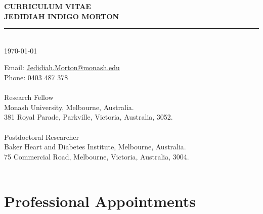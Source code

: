 \documentclass[11pt]{article}
\newcommand{\thedate}{\today}
\begin{document}
\begin{titlepage}
    \begin{center}
        \Huge
        \textbf{CURRICULUM VITAE \\
JEDIDIAH INDIGO MORTON}
\rule{16cm}{2mm} \\
\Large
\thedate \\
       \vfill
    \end{center}
        \Large

\noindent
Email: \color{blue}
 \href{mailto:Jedidiah.Morton@Monash.edu}{Jedidiah.Morton@monash.edu} \\
\color{black}
Phone: \color{blue} 0403 487 378 \\
\color{black}
 \\
Research Fellow \\
Monash University, Melbourne, Australia. \\
381 Royal Parade, Parkville, Victoria, Australia, 3052. \\
 \\
Postdoctoral Researcher \\
Baker Heart and Diabetes Institute, Melbourne, Australia. \\
75 Commercial Road, Melbourne, Victoria, Australia, 3004. \\
\\
\end{titlepage}

\tableofcontents


\color{white}
\cite{TanAJE2024,
DinaEJPC2024,
MortonVIH2024,
MehtaDRCP2024,
LivoriHLC2024,
FelekeDC2024,
ZiserBJCP2024,
ZiserJD2024,
AbebeNeur2024,
AbebeNeu2024,
DoodyAGG2024,
MacPE2024,
MortonDRCP2024,
TanCPT2024,
tanDRCP2024,
LivoriIJC2024,
LivoriEJPC2023,
MacCO2024,
FelekeDRCP2023,
LordPPT2023,
AbebeEHJ2023,
MortonPECA2023,
MortonAJKD2023,
DoodyAGG2023,
MacCirc2023,
DinaPE2023,
LloydDLOGIA2023,
MortonVIH2023,
TomicDRCP2023,
LazzDLOGIA2023,
QuigleyDRCP2022,
MacVIH2022,
MortonDLOGIA2023,
TomicDRCP2022,
TomicLDE2022,
MortonEJPC2023,
AdemiPE2022,
MortonDRCP2022,
MortonDM2022b,
MortonJECH2022,
OyunTAEM2022,
RuizDLOGIA2022,
MortonDC2022,
MortonJONS2022,
HastingsPE2022,
MortonDM2022a,
HardingNDT2022,
OyunSR2021,
MortonDC2021,
MortonDLOGIA2021,
MortonDC2020}
\color{black}
\pagebreak


\section*{Professional Appointments}
\end{document}
